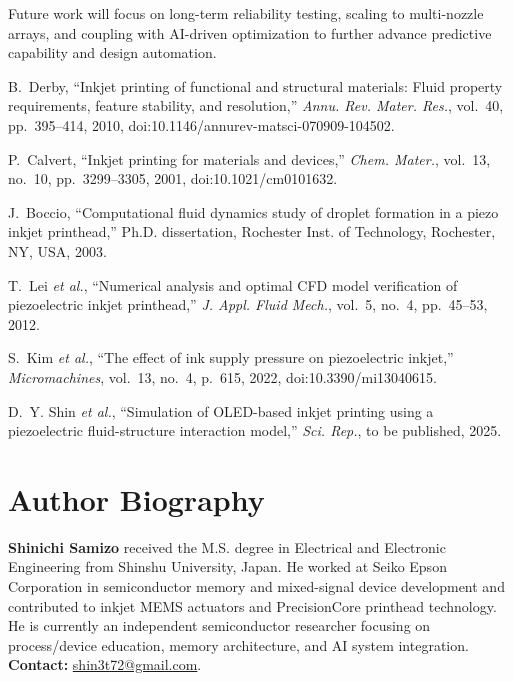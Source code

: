 \documentclass[conference]{IEEEtran}
\begin{document}
Future work will focus on long-term reliability testing, scaling to multi-nozzle arrays, and coupling with AI-driven optimization to further advance predictive capability and design automation.

\begin{thebibliography}{99}

B.~Derby, ``Inkjet printing of functional and structural materials: Fluid property requirements, feature stability, and resolution,'' 
\emph{Annu. Rev. Mater. Res.}, vol.~40, pp.~395--414, 2010, doi:10.1146/annurev-matsci-070909-104502.

P.~Calvert, ``Inkjet printing for materials and devices,'' 
\emph{Chem. Mater.}, vol.~13, no.~10, pp.~3299--3305, 2001, doi:10.1021/cm0101632.

J.~Boccio, ``Computational fluid dynamics study of droplet formation in a piezo inkjet printhead,'' 
Ph.D. dissertation, Rochester Inst. of Technology, Rochester, NY, USA, 2003.

T.~Lei \emph{et al.}, ``Numerical analysis and optimal CFD model verification of piezoelectric inkjet printhead,'' 
\emph{J. Appl. Fluid Mech.}, vol.~5, no.~4, pp.~45--53, 2012.

S.~Kim \emph{et al.}, ``The effect of ink supply pressure on piezoelectric inkjet,'' 
\emph{Micromachines}, vol.~13, no.~4, p.~615, 2022, doi:10.3390/mi13040615.

D.~Y. Shin \emph{et al.}, ``Simulation of OLED-based inkjet printing using a piezoelectric fluid-structure interaction model,'' 
\emph{Sci. Rep.}, to be published, 2025.

\end{thebibliography}

\section*{Author Biography}
\textbf{Shinichi Samizo} received the M.S. degree in Electrical and Electronic Engineering from Shinshu University, Japan. He worked at Seiko Epson Corporation in semiconductor memory and mixed-signal device development and contributed to inkjet MEMS actuators and PrecisionCore printhead technology. He is currently an independent semiconductor researcher focusing on process/device education, memory architecture, and AI system integration. \textbf{Contact:} \href{mailto:shin3t72@gmail.com}{shin3t72@gmail.com}.
\end{document}
